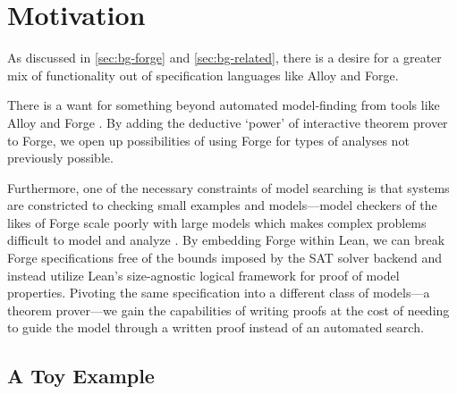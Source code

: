 \section{Motivation}\label{sec:motivation}

As discussed in \cref{sec:bg-forge} and \cref{sec:bg-related}, there is a desire for a greater mix of functionality out of specification languages like Alloy and Forge. 

There is a want for something beyond automated model-finding from tools like Alloy and Forge \cite{milicevic2014alpha}. By adding the deductive `power' of interactive theorem prover to Forge, we open up possibilities of using Forge for types of analyses not previously possible. 

Furthermore, one of the necessary constraints of model searching is that systems are constricted to checking small examples and models---model checkers of the likes of Forge scale poorly with large models which makes complex problems difficult to model and analyze \cite{bagheri2016titanium,ringert2020semantic}. By embedding Forge within Lean, we can break Forge specifications free of the bounds imposed by the SAT solver backend and instead utilize Lean's size-agnostic logical framework for proof of model properties. Pivoting the same specification into a different class of models---a theorem prover---we gain the capabilities of writing proofs at the cost of needing to guide the model through a written proof instead of an automated search.

\subsection{A Toy Example}\label{sec:toy-example}

